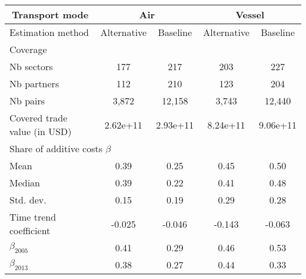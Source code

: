 \begin{tabular}{l|cc|cc}
\cline{1-5}
\multicolumn{1}{c}{Transport mode} &
  \multicolumn{2}{|c|}{Air} &
  \multicolumn{2}{c}{Vessel} \\ \hline
Estimation method &
Alternative &
Baseline &
Alternative &
Baseline \\ \hline
Coverage  \\ \hline
\hspace{1em}Nb sectors &
177 &
217 &
203 &
227 \\
\hspace{1em}Nb partners &
112 &
210 &
123 &
204 \\
\hspace{1em}Nb pairs &
3,872 &
12,158 &
3,743 &
12,440 \\ \hline
\multicolumn{1}{l}{\hspace{1em}Covered trade value (in USD)} &
2.62e+11 &
2.93e+11 &
8.24e+11 &
9.06e+11 \\
\multicolumn{5}{l}{Share of additive costs $\beta$}  \\ \hline
\hspace{1em}Mean &
0.39 &
0.25 &
0.45 &
0.50 \\
\hspace{1em}Median &
0.39 &
0.22 &
0.41 &
0.48 \\
\hspace{1em}Std. dev. &
0.15 &
0.19 &
0.29 &
0.28 \\
\hspace{1em}Time trend coefficient &
-0.025 &
-0.046 &
-0.143 &
-0.063 \\ \hline
$\beta_{2005}$ &
  0.41 &
0.29 &
0.46 &
0.53 \\
$\beta_{2013}$ &
0.38 &
0.27 &
0.44 &
0.33 \\
\cline{1-5}
\end{tabular}

